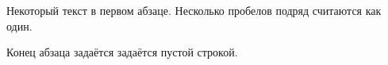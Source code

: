 \documentclass{article} %
\begin{document}
Некоторый текст в первом абзаце.
Несколько      пробелов подряд считаются как один.

Конец абзаца задаётся задаётся пустой строкой.
\end{document}
